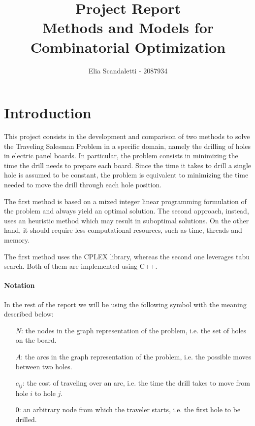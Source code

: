 \documentclass{article}
\title{
    Project Report
    \\ \Large
    Methods and Models for Combinatorial Optimization 
    }
\author{Elia Scandaletti - 2087934}
\begin{document}
\maketitle

\section{Introduction}
\label{sec:intro}

This project consists in the development and comparison of two methods to solve the Traveling Salesman Problem in a specific domain, namely the drilling of holes in electric panel boards.
In particular, the problem consists in minimizing the time the drill needs to prepare each board.
Since the time it takes to drill a single hole is assumed to be constant, the problem is equivalent to minimizing the time needed to move the drill through each hole position.

The first method is based on a mixed integer linear programming formulation of the problem and always yield an optimal solution.
The second approach, instead, uses an heuristic method which may result in suboptimal solutions.
On the other hand, it should require less computational resources, such as time, threads and memory.

The first method uses the CPLEX library, whereas the second one leverages tabu search.
Both of them are implemented using C++.

\paragraph{Notation}
In the rest of the report we will be using the following symbol with the meaning described below:
\begin{itemize}
    \item[$N$:] the nodes in the graph representation of the problem, i.e. the set of holes on the board.
    \item[$A$:] the arcs in the graph representation of the problem, i.e. the possible moves between two holes.
    \item[$c_{i j}$:] the cost of traveling over an arc, i.e. the time the drill takes to move from hole $i$ to hole $j$.
    \item[$0$:] an arbitrary node from which the traveler starts, i.e. the first hole to be drilled.
\end{itemize}
\end{document}
